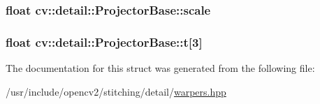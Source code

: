 \hypertarget{structcv_1_1detail_1_1ProjectorBase_a4677711ed88bb184e14781e716efe4c3}{
\subsubsection[{scale}]{\setlength{\rightskip}{0pt plus 5cm}float cv\-::detail\-::\-Projector\-Base\-::scale}}\label{structcv_1_1detail_1_1ProjectorBase_a4677711ed88bb184e14781e716efe4c3}
\hypertarget{structcv_1_1detail_1_1ProjectorBase_a337fa3c01b64e4a6ad8576442793a233}{
\subsubsection[{t}]{\setlength{\rightskip}{0pt plus 5cm}float cv\-::detail\-::\-Projector\-Base\-::t\mbox{[}3\mbox{]}}}\label{structcv_1_1detail_1_1ProjectorBase_a337fa3c01b64e4a6ad8576442793a233}


The documentation for this struct was generated from the following file\-:\begin{DoxyCompactItemize}
\item 
/usr/include/opencv2/stitching/detail/\hyperlink{detail_2warpers_8hpp}{warpers.\-hpp}\end{DoxyCompactItemize}
